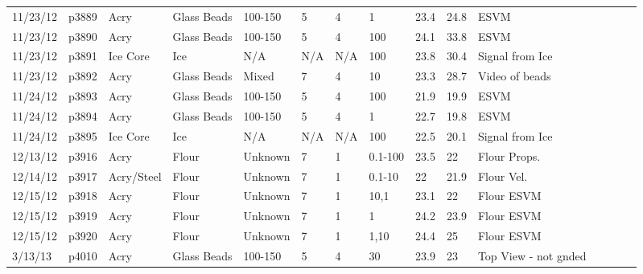 \begin{landscape}
\begin{longtable} {lllllllllllllll}
11/23/12 & p3889      & Acry          & Glass Beads  & 100-150      & 5         & 4             & 1                            & 23.4        & 24.8     & ESVM\\
11/23/12 & p3890      & Acry          & Glass Beads  & 100-150      & 5         & 4             & 100                          & 24.1        & 33.8     & ESVM\\
11/23/12 & p3891      & Ice Core         & Ice          & N/A          & N/A       & N/A           & 100                          & 23.8        & 30.4     & Signal from Ice\\
11/23/12 & p3892      & Acry          & Glass Beads  & Mixed        & 7         & 4             & 10                           & 23.3        & 28.7     & Video of beads\\
11/24/12 & p3893      & Acry          & Glass Beads  & 100-150      & 5         & 4             & 100                          & 21.9        & 19.9     & ESVM\\
11/24/12 & p3894      & Acry          & Glass Beads  & 100-150      & 5         & 4             & 1                            & 22.7        & 19.8     & ESVM\\
11/24/12 & p3895      & Ice Core         & Ice          & N/A          & N/A       & N/A           & 100                          & 22.5        & 20.1     & Signal from Ice\\
12/13/12 & p3916      & Acry          & Flour        & Unknown      & 7         & 1             & 0.1-100     & 23.5        & 22       & Flour Props.\\
12/14/12 & p3917      & Acry/Steel    & Flour        & Unknown      & 7         & 1             & 0.1-10                     & 22          & 21.9     & Flour Vel.\\
12/15/12 & p3918      & Acry          & Flour        & Unknown      & 7         & 1             & 10,1                         & 23.1        & 22       & Flour ESVM\\
12/15/12 & p3919      & Acry          & Flour        & Unknown      & 7         & 1             & 1                            & 24.2        & 23.9     & Flour ESVM\\
12/15/12 & p3920      & Acry          & Flour        & Unknown      & 7         & 1             & 1,10                         & 24.4        & 25       & Flour ESVM\\
3/13/13  & p4010      & Acry          & Glass Beads  & 100-150      & 5         & 4             & 30                           & 23.9        & 23       & Top View - not gnded\\

\end{longtable}
\end{landscape}
